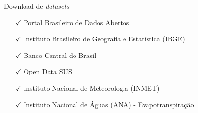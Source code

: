 \documentclass[xcolor=table,t]{beamer}
\begin{document}
\begin{frame}[c]{Download de \textit{datasets}}
\begin{itemize}
\justifying
\item[$\checkmark$] \normalsize{Portal Brasileiro de Dados Abertos} \newline 
\href{http://dados.gov.br/}{}
\vspace{0.1 cm}
\item[$\checkmark$] \normalsize{Instituto Brasileiro de Geografia e Estatística (IBGE)} \newline
\href{http://downloads.ibge.gov.br/}{}
\vspace{0.1 cm}
\item[$\checkmark$] \normalsize{Banco Central do Brasil} \newline 		\href{https://www3.bcb.gov.br/sgspub/localizarseries/localizarSeries.do?method=prepararTelaLocalizarSeries}{}
\vspace{0.1 cm}
\item[$\checkmark$] \normalsize{Open Data SUS} \newline
\href{https://opendatasus.saude.gov.br/}{}
\vspace{0.1 cm}
\item[$\checkmark$]  \normalsize{Instituto Nacional de Meteorologia (INMET)} \newline 
\href{http://www.inmet.gov.br/portal/index.php?r=bdmep/bdmep}{}
\vspace{0.1 cm}
\item[$\checkmark$]  \normalsize{Instituto Nacional de Águas (ANA) - Evapotranspiração} \newline 
\href{https://ssebop.users.earthengine.app/view/ssebop-br}{}
\end{itemize}
\end{frame}
\end{document}
